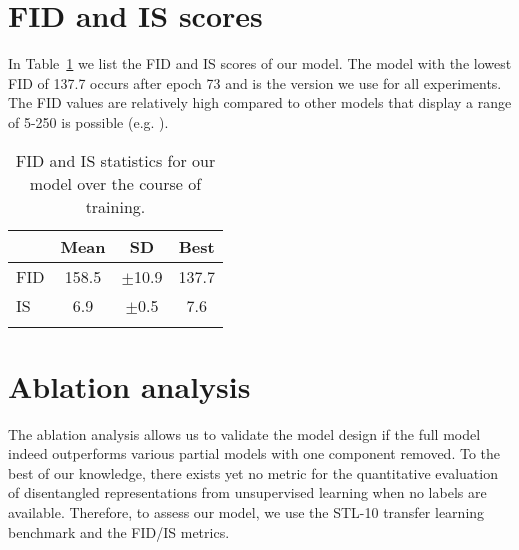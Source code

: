 \documentclass[a4paper,12pt]{report}
\begin{document}
\section{FID and IS scores}\label{sec:fid_is_scores}
In Table~\ref{tab:fid_is_stats} we list the FID and IS scores of our model. The model with the lowest FID of 137.7 occurs after epoch 73 and is the version we use for all experiments. The FID values are relatively high compared to other models that display a range of 5-250 is possible (e.g. \cite{StyleGAN, TTUR, SAGAN, SNGAN}).
\begin{table}[ht!]
\centering
\begin{tabular}{l|c|c|c}
\Xhline{0.8pt}
 & \textbf{Mean} & \textbf{SD} & \textbf{Best} \\
\hline
FID & 158.5 & $\pm$10.9 & 137.7\\
\hline
IS & 6.9 & $\pm$0.5 & 7.6\\
\Xhline{0.8pt}
\end{tabular}
\caption{FID and IS statistics for our model over the course of training.} 
\label{tab:fid_is_stats}
\end{table}


\section{Ablation analysis}
The ablation analysis allows us to validate the model design if the full model indeed outperforms various partial models with one component removed. To the best of our knowledge, there exists yet no metric for the quantitative evaluation of disentangled representations from unsupervised learning when no labels are available. Therefore, to assess our model, we use the STL-10 transfer learning benchmark and the FID/IS metrics.
\end{document}
